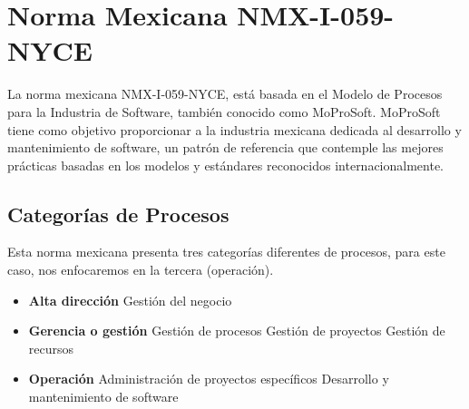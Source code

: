 \chapter{Norma Mexicana NMX-I-059-NYCE}
La norma mexicana NMX-I-059-NYCE, está basada en el Modelo de Procesos para la 
Industria de Software, también conocido como MoProSoft. MoProSoft tiene como objetivo proporcionar a la industria mexicana dedicada al desarrollo y mantenimiento de software, un patrón de referencia que contemple las mejores prácticas basadas en los modelos y estándares reconocidos internacionalmente. 

\section{Categorías de Procesos}
Esta norma mexicana presenta tres categorías diferentes de procesos, para este caso, nos enfocaremos en la tercera (operación).
\begin{itemize}
	\item \textbf{Alta dirección}
		\subitem Gestión del negocio
	\item \textbf{Gerencia o gestión}
		\subitem Gestión de procesos
		\subitem Gestión de proyectos 
		\subitem Gestión de recursos
	\item \textbf{Operación}
		\subitem Administración de proyectos específicos
		\subitem Desarrollo y mantenimiento de software
\end{itemize}